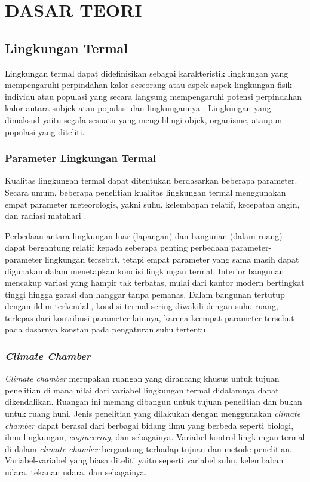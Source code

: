 \chapter{DASAR TEORI}
\label{dasar-teori}

\section{Lingkungan Termal}

Lingkungan termal dapat didefinisikan sebagai karakteristik lingkungan yang mempengaruhi perpindahan kalor seseorang \cite{ASHRAE55} atau aspek-aspek lingkungan fisik individu atau populasi yang secara langsung mempengaruhi potensi perpindahan kalor antara subjek atau populasi dan lingkungannya \cite{book1}. Lingkungan yang dimaksud yaitu segala sesuatu yang mengelilingi objek, organisme, ataupun populasi yang diteliti.

\subsection{Parameter Lingkungan Termal}

Kualitas lingkungan termal dapat ditentukan berdasarkan beberapa parameter. Secara umum, beberapa penelitian kualitas lingkungan termal menggunakan empat parameter meteorologis, yakni suhu, kelembapan relatif, kecepatan angin, dan radiasi matahari \cite{book1}.

Perbedaan antara lingkungan luar (lapangan) dan bangunan (dalam ruang) dapat bergantung relatif kepada seberapa penting perbedaan parameter-parameter lingkungan tersebut, tetapi empat parameter yang sama masih dapat digunakan dalam menetapkan kondisi lingkungan termal. Interior bangunan mencakup variasi yang hampir tak terbatas, mulai dari kantor modern bertingkat tinggi hingga garasi dan hanggar tanpa pemanas. Dalam bangunan tertutup dengan iklim terkendali, kondisi termal sering diwakili dengan suhu ruang, terlepas dari kontribusi parameter lainnya, karena keempat parameter tersebut pada dasarnya konstan pada pengaturan suhu tertentu.

\subsection{\textit{Climate Chamber}}

\textit{Climate chamber} merupakan ruangan yang dirancang khusus untuk tujuan penelitian di mana nilai dari variabel lingkungan termal didalamnya dapat dikendalikan. Ruangan ini memang dibangun untuk tujuan penelitian dan bukan untuk ruang huni. Jenis penelitian yang dilakukan dengan menggunakan \textit{climate chamber} dapat berasal dari berbagai bidang ilmu yang berbeda seperti biologi, ilmu lingkungan, \textit{engineering}, dan sebagainya. Variabel kontrol lingkungan termal di dalam \textit{climate chamber} bergantung terhadap tujuan dan metode penelitian. Variabel-variabel yang biasa diteliti yaitu seperti variabel suhu, kelembaban udara, tekanan udara, dan sebagainya.

